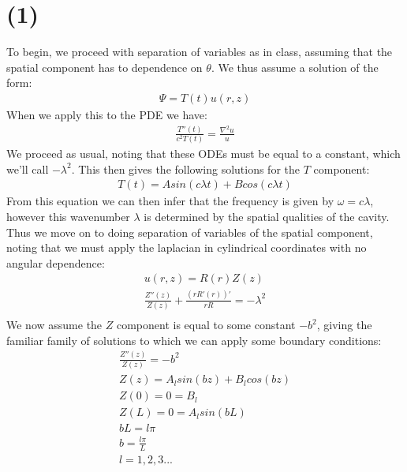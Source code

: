 \documentclass{article}
\begin{document}
\section*{\textbf{(1)}}
To begin, we proceed with separation of variables as in class, assuming that the spatial component has to dependence on $\theta$. We thus assume a solution of the form:
\begin{equation}
\begin{aligned}
\Psi = T(t)u(r,z)
\end{aligned}
\end{equation}
When we apply this to the PDE we have:
\begin{equation}
\begin{aligned}
\frac{T''(t)}{c^2T(t)} = \frac{\nabla^2u}{u}
\end{aligned}
\end{equation}
We proceed as usual, noting that these ODEs must be equal to a constant, which we'll call $-\lambda^2$. This then gives the following solutions for the $T$ component:
\begin{equation}
\begin{aligned}
T(t) = Asin(c\lambda t) + Bcos(c\lambda t)
\end{aligned}
\end{equation}
From this equation we can then infer that the frequency is given by $\omega = c\lambda$, however this wavenumber $\lambda$ is determined by the spatial qualities of the cavity. Thus we move on to doing separation of variables of the spatial component, noting that we must apply the laplacian in cylindrical coordinates with no angular dependence:
\begin{equation}
\begin{aligned}
u(r,z) = R(r)Z(z)\\
\frac{Z''(z)}{Z(z)} + \frac{(rR'(r))'}{rR} = -\lambda^2\\ 
\end{aligned}
\end{equation}
We now assume the $Z$ component is equal to some constant $-b^2$, giving the familiar family of solutions to which we can apply some boundary conditions:
\begin{equation}
\begin{aligned}
\frac{Z''(z)}{Z(z)} = -b^2\\
Z(z) = A_lsin(bz) + B_lcos(bz)\\
Z(0) = 0 = B_l\\
Z(L) = 0 = A_lsin(bL)\\
bL = l\pi\\
b = \frac{l\pi}{L}\\
l = 1,2,3...
\end{aligned}
\end{equation}
\end{document}
